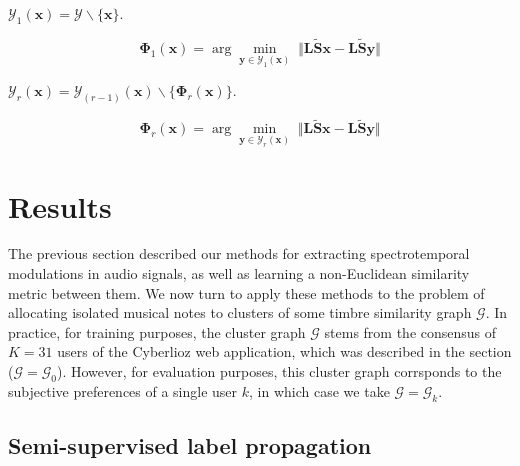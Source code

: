 \documentclass{bmcart}
\newcommand{\lnameref}[1]{%
\bgroup
\let\nmu\MakeLowercase
\nameref{#1}\egroup}
\newcommand{\nmu}{}
\begin{document}
$\mathcal{Y}_1 (\boldsymbol{x}) = \mathcal{Y} \backslash \lbrace \boldsymbol{x} \rbrace$.

\begin{equation}
\mathbf{\Phi}_1 (\boldsymbol{x}) =
\arg \min_{\boldsymbol{y}\in \mathcal{Y}_1(\boldsymbol{x})}
\;
\big\Vert
\mathbf{L}\mathbf{\widetilde{S}}\boldsymbol{x}
-
\mathbf{L}\mathbf{\widetilde{S}}\boldsymbol{y}
\big\Vert
\end{equation}

$\mathcal{Y}_{r} (\boldsymbol{x}) = \mathcal{Y}_{(r-1)}(\boldsymbol{x}) \backslash \lbrace \mathbf{\Phi}_r (\boldsymbol{x}) \rbrace$.

\begin{equation}
\mathbf{\Phi}_r (\boldsymbol{x}) =
\arg \min_{\boldsymbol{y}\in \mathcal{Y}_r(\boldsymbol{x})}
\;
\big\Vert
\mathbf{L}\mathbf{\widetilde{S}}\boldsymbol{x}
-
\mathbf{L}\mathbf{\widetilde{S}}\boldsymbol{y}
\big\Vert
\end{equation}


\section*{\nmu Results}
\label{sec:results}

The previous section described our methods for extracting spectrotemporal modulations in audio signals, as well as learning a non-Euclidean similarity metric between them.
We now turn to apply these methods to the problem of allocating isolated musical notes to clusters of some timbre similarity graph $\mathcal{G}$.
In practice, for training purposes, the cluster graph $\mathcal{G}$ stems from the consensus of $K=31$ users of the Cyberlioz web application, which was described in the \lnameref{sec:survey} section ($\mathcal{G}=\mathcal{G}_0$).
However, for evaluation purposes, this cluster graph corrsponds to the subjective preferences of a single user $k$, in which case we take $\mathcal{G}=\mathcal{G}_k$.




\subsection*{Semi-supervised label propagation}
\end{document}
